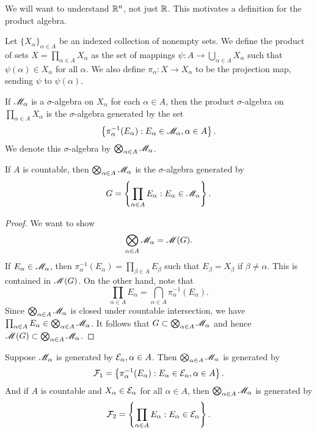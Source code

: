 \documentclass[12pt]{article} %
\begin{document}
We will want to understand $\mathbb{R}^n$, not just $\mathbb{R}$. This motivates a definition for the product algebra.

\begin{definition}
    Let $\{X_\alpha\}_{\alpha \in A}$ be an indexed collection of nonempty sets. We define the product of sets $X = \prod_{\alpha \in A} X_\alpha$ as the set of mappings $\psi : A \to \bigcup_{\alpha \in A} X_\alpha$ such that $\psi(\alpha) \in X_\alpha$ for all $\alpha$. We also define $\pi_\alpha : X \to X_\alpha$ to be the projection map, sending $\psi$ to $\psi(\alpha)$.

    If $\mathscr{M}_\alpha$ is a $\sigma$-algebra on $X_\alpha$ for each $\alpha \in A$, then the product $\sigma$-algebra on $\prod_{\alpha \in A} X_\alpha$ is the $\sigma$-algebra generated by the set \[\left\{ \pi_{\alpha}^{-1}(E_\alpha) : E_\alpha \in \mathscr{M}_\alpha, \alpha \in A\right\}.\] We denote this $\sigma$-algebra by $\bigotimes_{\alpha \in A} \mathscr{M}_\alpha$.
\end{definition}

\begin{proposition}\label{prop:1.3}
    If $A$ is countable, then $\bigotimes_{\alpha \in A} \mathscr{M}_\alpha$ is the $\sigma$-algebra generated by \[G = \left\{ \prod_{\alpha \in A} E_\alpha : E_\alpha \in \mathscr{M}_\alpha\right\}.\]
\end{proposition}

\begin{proof}
    We want to show \[\bigotimes_{\alpha \in A} \mathscr{M}_\alpha = \mathscr{M}(G).\]
    If $E_\alpha \in \mathscr{M}_\alpha$, then $\pi_{\alpha}^{-1}(E_\alpha) = \prod_{\beta \in A} E_\beta$ such that $E_\beta = X_\beta$ if $\beta \neq \alpha$. This is contained in $\mathscr{M}(G)$. On the other hand, note that \[\prod_{\alpha \in A}E_\alpha = \bigcap_{\alpha \in A} \pi_{\alpha}^{-1}(E_\alpha).\] Since $\bigotimes_{\alpha \in A} \mathscr{M}_\alpha$ is closed under countable intersection, we have $\prod_{\alpha \in A}E_\alpha \in \bigotimes_{\alpha \in A} \mathscr{M}_\alpha$. It follows that $G \subset \bigotimes_{\alpha \in A} \mathscr{M}_\alpha$ and hence $\mathscr{M}(G) \subset \bigotimes_{\alpha \in A} \mathscr{M}_\alpha$.
\end{proof}

\begin{proposition}\label{prop:1.4}
    Suppose $\mathscr{M}_\alpha$ is generated by $\mathcal{E}_\alpha, \alpha \in A$. Then $\bigotimes_{\alpha \in A} \mathscr{M}_\alpha$ is generated by \[\mathcal{F}_1 = \left\{ \pi_{\alpha}^{-1}(E_\alpha) : E_\alpha \in \mathcal{E}_\alpha, \alpha \in A \right\}.\] And if $A$ is countable and $X_\alpha \in \mathcal{E}_\alpha$ for all $\alpha \in A$, then $\bigotimes_{\alpha \in A} \mathscr{M}_\alpha$ is generated by \[\mathcal{F}_2 = \left\{ \prod_{\alpha \in A} E_\alpha : E_\alpha \in \mathcal{E}_\alpha \right\}.\]
\end{proposition}
\end{document}
